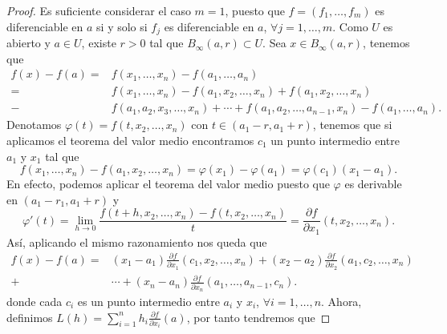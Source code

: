 \begin{proof}
Es suficiente considerar el caso $\displaystyle m = 1 $, puesto que $\displaystyle f = \left(f_{1}, \ldots, f_{m}\right) $ es diferenciable en $\displaystyle a $ si y solo si $\displaystyle f_{j}  $ es diferenciable en $\displaystyle a $, $\displaystyle \forall j = 1, \ldots, m $. Como $\displaystyle U $ es abierto y $\displaystyle a \in U $, existe $\displaystyle r > 0 $ tal que $\displaystyle B_{\infty}\left(a,r\right) \subset U $.
Sea $\displaystyle x \in B_{\infty}\left(a,r\right) $, tenemos que
\[
\begin{split}
	f\left(x\right)-f\left(a\right) = & f\left(x_{1}, \ldots, x_{n}\right) - f\left(a_{1}, \ldots, a_{n}\right) \\
	= & f\left(x_{1}, \ldots, x_{n}\right) -f\left(a_{1}, x_{2}, \ldots, x_{n}\right) + f\left(a_{1}, x_{2}, \ldots, x_{n}\right) \\
	- &  f\left(a_{1}, a_{2}, x_{3}, \ldots, x_{n}\right) + \cdots + f\left(a_{1}, a_{2}, \ldots, a_{n-1}, x_{n}\right) - f\left(a_{1}, \ldots, a_{n}\right).
\end{split}
\]
Denotamos $\displaystyle \varphi\left(t\right) = f\left(t,x_{2}, \ldots, x_{n}\right) $ con $\displaystyle t \in \left(a_{1}-r, a_{1}+r\right) $, tenemos que si aplicamos el teorema del valor medio encontramos $\displaystyle c_{1}  $ un punto intermedio entre $\displaystyle a_{1} $ y $\displaystyle x_{1} $ tal que
\[f\left(x_{1}, \ldots, x_{n}\right) -f\left(a_{1}, x_{2}, \ldots, x_{n}\right) = \varphi\left(x_{1}\right)-\varphi\left(a_{1}\right) = \varphi\left(c_{1}\right)\left(x_{1}-a_{1}\right)   .\]
En efecto, podemos aplicar el teorema del valor medio puesto que $\displaystyle \varphi $ es derivable en $\displaystyle \left(a_{1}-r_{1}, a_{1}+r\right) $ y 
\[\varphi'\left(t\right) = \lim_{h \to 0}\frac{f\left(t+h, x_{2}, \ldots, x_{n}\right)-f\left(t, x_{2}, \ldots, x_{n}\right)}{t} = \frac{\partial f}{\partial x_{1}}\left(t, x_{2}, \ldots, x_{n}\right) .\]
Así, aplicando el mismo razonamiento nos queda que 
\[
\begin{split}
	f\left(x\right)-f\left(a\right) = & \left(x_{1}-a_{1}\right)\frac{\partial f}{\partial x_{1}}\left(c_{1}, x_{2}, \ldots, x_{n}\right) + \left(x_{2}-a_{2}\right)\frac{\partial f}{\partial x_{2}}\left(a_{1}, c_{2}, \ldots, x_{n}\right) \\
	+ &  \cdots + \left(x_{n}-a_{n}\right)\frac{\partial f}{\partial x_{n}}\left(a_{1}, \ldots, a_{n-1}, c_{n}\right) .
\end{split}
\]
donde cada $\displaystyle c_{i} $ es un punto intermedio entre $\displaystyle a_{i} $ y $\displaystyle x_{i} $, $\displaystyle \forall i = 1, \ldots, n $. Ahora, definimos $\displaystyle L\left(h\right) = \sum^{n}_{i = 1}h_{i}\frac{\partial f}{\partial x_{i}}\left(a\right) $, por tanto tendremos que

\end{proof}
